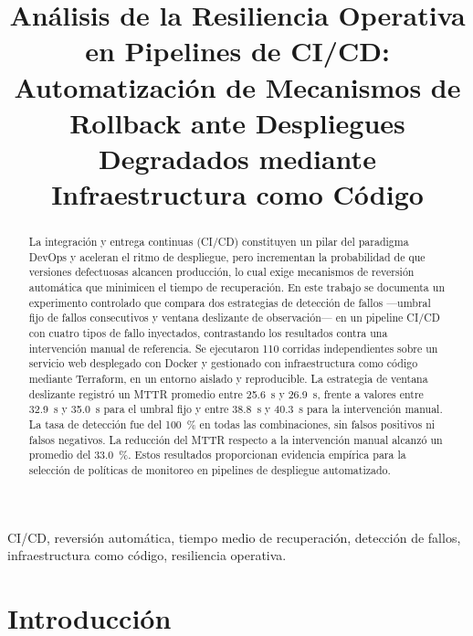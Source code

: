 \documentclass[conference]{IEEEtran}
\begin{document}
\title{An\'alisis de la Resiliencia Operativa en Pipelines de CI/CD: Automatizaci\'on de Mecanismos de Rollback ante Despliegues Degradados mediante Infraestructura como C\'odigo}

\author{
\and
{}
}

\maketitle

\pagestyle{empty}
\thispagestyle{empty}

\begin{abstract}
La integraci\'on y entrega continuas (CI/CD) constituyen un pilar del paradigma DevOps y aceleran el ritmo de despliegue, pero incrementan la probabilidad de que versiones defectuosas alcancen producci\'on, lo cual exige mecanismos de reversi\'on autom\'atica que minimicen el tiempo de recuperaci\'on. En este trabajo se documenta un experimento controlado que compara dos estrategias de detecci\'on de fallos ---umbral fijo de fallos consecutivos y ventana deslizante de observaci\'on--- en un pipeline CI/CD con cuatro tipos de fallo inyectados, contrastando los resultados contra una intervenci\'on manual de referencia. Se ejecutaron 110 corridas independientes sobre un servicio web desplegado con Docker y gestionado con infraestructura como c\'odigo mediante Terraform, en un entorno aislado y reproducible. La estrategia de ventana deslizante registr\'o un MTTR promedio entre 25.6~s y 26.9~s, frente a valores entre 32.9~s y 35.0~s para el umbral fijo y entre 38.8~s y 40.3~s para la intervenci\'on manual. La tasa de detecci\'on fue del 100~\% en todas las combinaciones, sin falsos positivos ni falsos negativos. La reducci\'on del MTTR respecto a la intervenci\'on manual alcanz\'o un promedio del 33.0~\%. Estos resultados proporcionan evidencia emp\'irica para la selecci\'on de pol\'iticas de monitoreo en pipelines de despliegue automatizado.
\end{abstract}

\renewcommand{\IEEEkeywordsname}{Index Terms}
\begin{IEEEkeywords}
CI/CD, reversi\'on autom\'atica, tiempo medio de recuperaci\'on, detecci\'on de fallos, infraestructura como c\'odigo, resiliencia operativa.
\end{IEEEkeywords}

\section{Introducci\'on}
\end{document}
